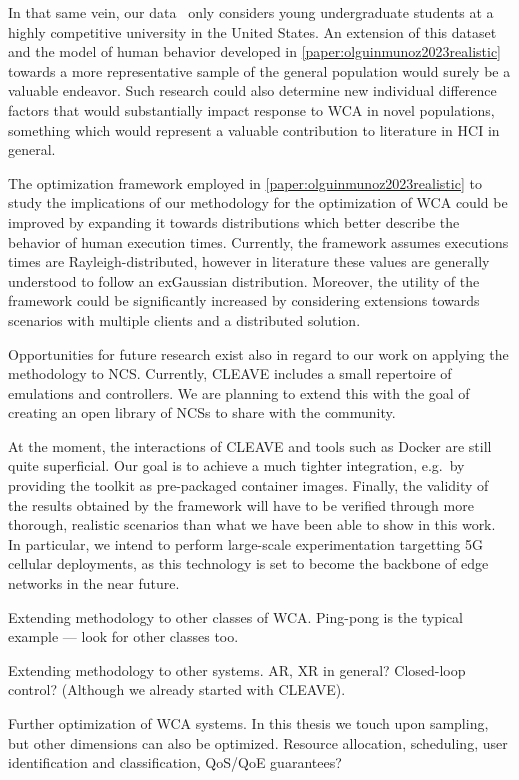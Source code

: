 In that same vein, our data~\cite{olguinmunoz:impact2021} only considers young undergraduate students at a highly competitive university in the United States.
An extension of this dataset and the model of human behavior developed in \cref{paper:olguinmunoz2023realistic} towards a more representative sample of the general population would surely be a valuable endeavor.
Such research could also determine new individual difference factors that would substantially impact response to \gls{WCA} in novel populations, something which would represent a valuable contribution to literature in \gls{HCI} in general.

The optimization framework employed in \cref{paper:olguinmunoz2023realistic} to study the implications of our methodology for the optimization of \gls{WCA} could be improved by expanding it towards distributions which better describe the behavior of human execution times.
Currently, the framework assumes executions times are Rayleigh-distributed, however in literature these values are generally understood to follow an \gls{exGaussian} distribution.
Moreover, the utility of the framework could be significantly increased by considering extensions towards scenarios with multiple clients and a distributed solution.

\medskip
Opportunities for future research exist also in regard to our work on applying the methodology to \gls{NCS}.
Currently, \gls{CLEAVE} includes a small repertoire of emulations and controllers.
We are planning to extend this with the goal of creating an open library of \glspl{NCS} to share with the community.




At the moment, the interactions of \gls{CLEAVE} and tools such as Docker are still quite superficial.
Our goal is to achieve a much tighter integration, e.g.\ by providing the toolkit as pre-packaged container images.
Finally, the validity of the results obtained by the framework will have to be verified through more thorough, realistic scenarios than what we have been able to show in this work.
In particular, we intend to perform large-scale experimentation targetting 5G cellular deployments, as this technology is set to become the backbone of edge networks in the near future.







Extending methodology to other classes of \gls{WCA}.
Ping-pong is the typical example --- look for other classes too.

Extending methodology to other systems.
\gls{AR}, \gls{XR} in general?
Closed-loop control? (Although we already started with CLEAVE).

Further optimization of \gls{WCA} systems.
In this thesis we touch upon sampling, but other dimensions can also be optimized.
Resource allocation, scheduling, user identification and classification, QoS/QoE guarantees?
